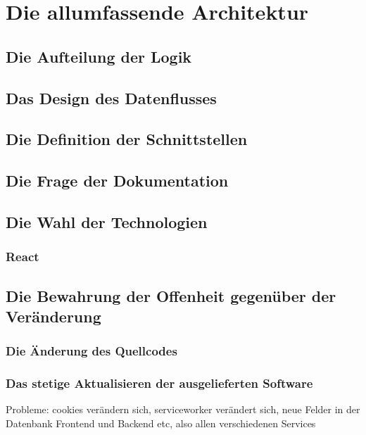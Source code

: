 \chapter{Die allumfassende Architektur}
\label{chap:die-allumfassende-architektur}

\section{Die Aufteilung der Logik}
\label{sec:die-aufteilung-der-logic}

\section{Das Design des Datenflusses}
\label{sec:das-design-des-datenflusses}

\section{Die Definition der Schnittstellen}
\label{sec:die-definition-der-schnittstellen}

\section{Die Frage der Dokumentation}

\section{Die Wahl der Technologien}

\subsection{React}

\section{Die Bewahrung der Offenheit gegenüber der Veränderung}
\label{sec:die-bewahrung-der-offenheit-gegenueber-der-veraenderung}

\subsection{Die Änderung des Quellcodes}

\subsection{Das stetige Aktualisieren der ausgelieferten Software}
Probleme: cookies verändern sich, serviceworker verändert sich, neue Felder in der Datenbank
Frontend und Backend etc, also allen verschiedenen Services

